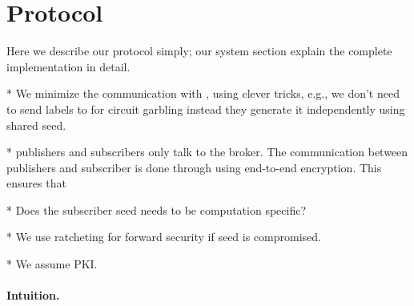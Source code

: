 \section{Protocol}
\label{sec:protocol}

Here we describe our protocol simply; our system section explain the complete
implementation in detail.

* We minimize the communication with \garbler, using clever tricks, e.g.,
we don't need to send labels to \garbler for circuit garbling instead they
generate it independently using shared seed.

* publishers and subscribers only talk to the broker. The communication
between publishers and subscriber is done through \broker using end-to-end
encryption. This ensures that 

* Does the subscriber seed needs to be computation specific?

* We use ratcheting for forward security if seed is compromised.

* We assume PKI.

\paragraph{Intuition.}

